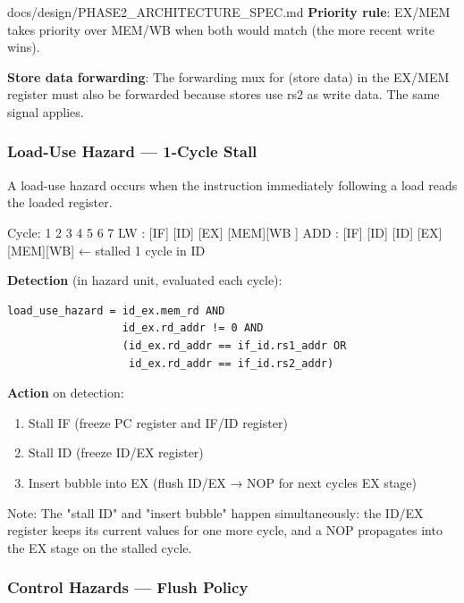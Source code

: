 \begin{relocated}{docs/design/PHASE2_ARCHITECTURE_SPEC.md}
\textbf{Priority rule}: EX/MEM takes priority over MEM/WB when both
would match (the more recent write wins).

\textbf{Store data forwarding}: The forwarding mux for 
(store data) in the EX/MEM register must also be forwarded because
stores use rs2 as write data. The same  signal applies.

\subsubsection{Load-Use Hazard --- 1-Cycle Stall}\label{ds:ch:phase2-architecture:32-load-use-hazard-1-cycle-stall}

A load-use hazard occurs when the instruction immediately following a
load reads the loaded register.

\begin{textblock}
Cycle:  1    2    3    4    5    6    7
LW  :  [IF] [ID] [EX] [MEM][WB ]
ADD :       [IF] [ID] [ID] [EX] [MEM][WB]   ← stalled 1 cycle in ID
\end{textblock}

\textbf{Detection} (in hazard unit, evaluated each cycle):

\begin{lstlisting}[language={}]
load_use_hazard = id_ex.mem_rd AND
                  id_ex.rd_addr != 0 AND
                  (id_ex.rd_addr == if_id.rs1_addr OR
                   id_ex.rd_addr == if_id.rs2_addr)
\end{lstlisting}

\textbf{Action} on detection:

\begin{enumerate}
\def\labelenumi{\arabic{enumi}.}
\tightlist
\item
  Stall IF (freeze PC register and IF/ID register)
\item
  Stall ID (freeze ID/EX register)
\item
  Insert bubble into EX (flush ID/EX → NOP for next
  cycle\textquotesingle s EX stage)
\end{enumerate}

Note: The "stall ID" and "insert bubble" happen simultaneously: the
ID/EX register keeps its current values for one more cycle, and a NOP
propagates into the EX stage on the stalled cycle.

\subsubsection{Control Hazards --- Flush Policy}\label{ds:ch:phase2-architecture:33-control-hazards-flush-policy}


\end{relocated}
